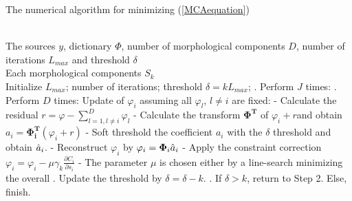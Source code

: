 \begin{algorithm}
\caption{The numerical algorithm for minimizing (\ref{MCAequation})} 
\label{algFramwork1} 
\begin{algorithmic} %
\REQUIRE ~~\\%
The sources $y$, dictionary $\Phi$, number of morphological components $D$, number of iterations $L_{max}$ and threshold $\delta$
\ENSURE ~~\\ %
Each morphological components $S_k$\\
\STATE Initialize $L_{max}$; number of iterations; threshold $ \delta= k L_{max}$;
. Perform $J$ times:
\STATE {}. Perform $D$ times:
\STATE \qquad \quad Update of $\varphi_i$ assuming all $\varphi_l$, $l \neq i$ are fixed:
\STATE \qquad \quad - Calculate the residual $r = \varphi − \sum_{l=1, l \neq i}^D \varphi_l$
\STATE \qquad \quad - Calculate the transform $\mathbf{\Phi^T}$ of $\varphi_i + r$and obtain $a_i = \mathbf{\Phi_i^T} (\varphi_i + r)$
\STATE \qquad \quad - Soft threshold the coefficient $a_i$ with the $\delta$ threshold and obtain $\Hat{a}_i$.
\STATE \qquad \quad - Reconstruct $\varphi_i$ by $\varphi_i = \mathbf{\Phi}_i \Hat{a}_i$
\STATE \qquad \quad - Apply the constraint correction $\varphi_i = \varphi_i - \mu \gamma_k \frac{\partial C_i}{\partial s_i}$
\STATE \qquad \quad - The parameter $\mu$ is chosen either by a line-search minimizing the overall 
. Update the threshold by $\delta = \delta - k$.
. If $\delta  > k$, return to Step 2. Else, finish.
\end{algorithmic}
\end{algorithm}

